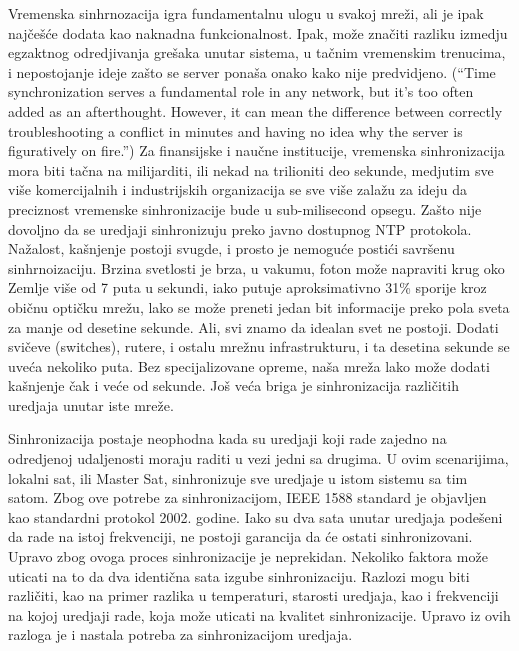 \documentclass[a4paper,12pt, master]{etf}
\begin{document}
	Vremenska sinhrnozacija igra fundamentalnu ulogu u svakoj mre\v{z}i, ali je
	ipak naj\v{c}e\v{s}\'{c}e dodata kao naknadna funkcionalnost. Ipak,
	mo\v{z}e zna\v{c}iti razliku izmedju egzaktnog odredjivanja gre\v{s}aka
	unutar sistema, u ta\v{c}nim vremenskim trenucima, i nepostojanje ideje
	za\v{s}to se server pona\v{s}a onako kako nije predvidjeno. (``Time
	synchronization	serves a fundamental role in any network, but it's too
	often added as an afterthought.	However, it can mean the difference between
	correctly troubleshooting a conflict in	minutes and having no idea why the
	server is figuratively on fire.'') Za finansijske i nau\v{c}ne institucije,
	vremenska sinhronizacija mora biti ta\v{c}na na milijarditi, ili nekad na
	trilioniti deo sekunde, medjutim sve vi\v{s}e komercijalnih i industrijskih
	organizacija se sve vi\v{s}e zala\v{z}u za ideju da preciznost vremenske
	sinhronizacije bude u sub-milisecond opsegu. Za\v{s}to nije dovoljno da se
	uredjaji sinhronizuju preko javno dostupnog NTP protokola. Na\v{z}alost,
	ka\v{s}njenje postoji svugde, i prosto je nemogu\'{c}e posti\'{c}i
	savr\v{s}enu sinhrnoizaciju. Brzina svetlosti je brza, u vakumu, foton
	mo\v{z}e napraviti krug oko Zemlje vi\v{s}e od 7 puta u sekundi, iako
	putuje aproksimativno 31\% sporije kroz obi\v{c}nu opti\v{c}ku mre\v{z}u,
	lako se mo\v{z}e preneti jedan bit informacije preko pola sveta za manje od
	desetine sekunde. Ali, svi znamo da idealan svet ne postoji. Dodati
	svi\v{c}eve (switches),	rutere, i ostalu mre\v{z}nu infrastrukturu, i ta
	desetina sekunde se uve\'{c}a nekoliko puta. Bez specijalizovane opreme,
	na\v{s}a mre\v{z}a lako mo\v{z}e dodati ka\v{s}njenje \v{c}ak i ve\'{c}e od
	sekunde. Jo\v{s} ve\'{c}a briga je sinhronizacija razli\v{c}itih uredjaja
	unutar iste mre\v{z}e.

	Sinhronizacija postaje neophodna kada su uredjaji koji rade zajedno na
	odredjenoj udaljenosti moraju raditi u vezi jedni sa drugima. U ovim
	scenarijima, lokalni sat, ili Master Sat, sinhronizuje sve uredjaje u istom
	sistemu sa tim satom. Zbog ove potrebe za sinhronizacijom, IEEE 1588
	standard je objavljen kao standardni protokol 2002. godine. Iako su dva
	sata unutar uredjaja pode\v{s}eni da rade na istoj frekvenciji, ne postoji
	garancija da \'{c}e ostati sinhronizovani. Upravo zbog ovoga proces
	sinhronizacije je neprekidan. Nekoliko faktora mo\v{z}e uticati na to da
	dva identi\v{c}na sata izgube sinhronizaciju. Razlozi mogu biti
	razli\v{c}iti, kao na primer razlika u temperaturi, starosti uredjaja, kao
	i frekvenciji na kojoj uredjaji rade, koja mo\v{z}e uticati na kvalitet
	sinhronizacije. Upravo iz ovih razloga je i	nastala potreba za
	sinhronizacijom uredjaja.
\end{document}
